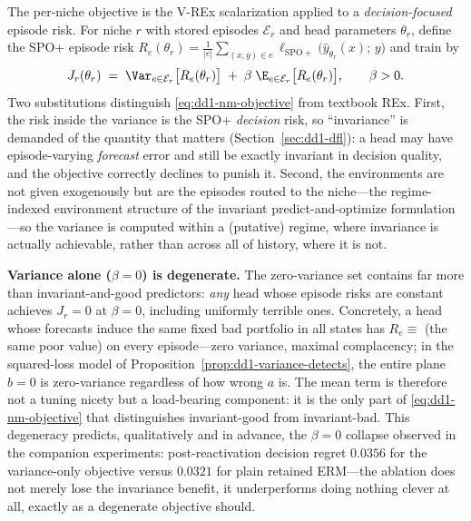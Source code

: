 The \nm{} per-niche objective is the V-REx scalarization applied to a
\emph{decision-focused} episode risk. For niche $r$ with stored episodes
$\mathcal{E}_r$ and head parameters $\theta_r$, define the SPO+ episode risk
$R_e(\theta_r) = \frac{1}{|e|}\sum_{(x, y) \in e}
\ell_{\mathrm{SPO+}}\bigl( \hat y_{\theta_r}(x);\, y \bigr)$ and train by
\begin{equation}
\label{eq:dd1-nm-objective}
J_r(\theta_r)
\;=\; \Var_{e \in \mathcal{E}_r}\bigl[ R_e(\theta_r) \bigr]
\;+\; \beta\; \E_{e \in \mathcal{E}_r}\bigl[ R_e(\theta_r) \bigr],
\qquad \beta > 0 .
\end{equation}
Two substitutions distinguish \eqref{eq:dd1-nm-objective} from textbook REx.
First, the risk inside the variance is the SPO+ \emph{decision} risk, so
``invariance'' is demanded of the quantity that matters
(Section~\ref{sec:dd1-dfl}): a head may have episode-varying \emph{forecast}
error and still be exactly invariant in decision quality, and the objective
correctly declines to punish it. Second, the environments are not given
exogenously but are the episodes routed to the niche---the regime-indexed
environment structure of the invariant predict-and-optimize formulation
\cite{yan2026invpnco}---so the variance is computed within a (putative)
regime, where invariance is actually achievable, rather than across all of
history, where it is not.

\begin{warning}
\textbf{Variance alone ($\beta = 0$) is degenerate.} The zero-variance set
contains far more than invariant-and-good predictors: \emph{any} head whose
episode risks are constant achieves $J_r = 0$ at $\beta = 0$, including
uniformly terrible ones. Concretely, a head whose forecasts induce the same
fixed bad portfolio in all states has $R_e \equiv$ (the same poor value) on
every episode---zero variance, maximal complacency; in the squared-loss model
of Proposition~\ref{prop:dd1-variance-detects}, the entire plane $b = 0$ is
zero-variance regardless of how wrong $a$ is. The mean term is therefore not
a tuning nicety but a load-bearing component: it is the only part of
\eqref{eq:dd1-nm-objective} that distinguishes invariant-good from
invariant-bad. This degeneracy predicts, qualitatively and in advance, the
$\beta = 0$ collapse observed in the companion experiments: post-reactivation
decision regret $0.0356$ for the variance-only objective versus $0.0321$ for
plain retained ERM---the ablation does not merely lose the invariance
benefit, it underperforms doing nothing clever at all, exactly as a
degenerate objective should.
\end{warning}

